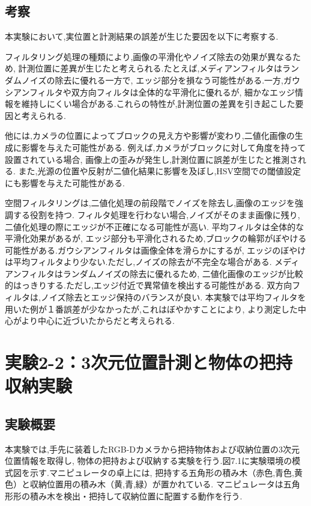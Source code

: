\subsection{考察}
本実験において,実位置と計測結果の誤差が生じた要因を以下に考察する.

フィルタリング処理の種類により,画像の平滑化やノイズ除去の効果が異なるため,
計測位置に差異が生じたと考えられる.たとえば,メディアンフィルタはランダムノイズの除去に優れる一方で,
エッジ部分を損なう可能性がある.一方,ガウシアンフィルタや双方向フィルタは全体的な平滑化に優れるが,
細かなエッジ情報を維持しにくい場合がある.これらの特性が,計測位置の差異を引き起こした要因と考えられる.

他には,カメラの位置によってブロックの見え方や影響が変わり,二値化画像の生成に影響を与えた可能性がある.
例えば,カメラがブロックに対して角度を持って設置されている場合,
画像上の歪みが発生し,計測位置に誤差が生じたと推測される.
また,光源の位置や反射が二値化結果に影響を及ぼし,HSV空間での閾値設定にも影響を与えた可能性がある.

空間フィルタリングは,二値化処理の前段階でノイズを除去し,画像のエッジを強調する役割を持つ.
フィルタ処理を行わない場合,ノイズがそのまま画像に残り,
二値化処理の際にエッジが不正確になる可能性が高い. 平均フィルタは全体的な平滑化効果があるが,
エッジ部分も平滑化されるため,ブロックの輪郭がぼやける可能性がある.ガウシアンフィルタは画像全体を滑らかにするが,
エッジのぼやけは平均フィルタより少ない.ただし,ノイズの除去が不完全な場合がある.
メディアンフィルタはランダムノイズの除去に優れるため,
二値化画像のエッジが比較的はっきりする.ただし,エッジ付近で異常値を検出する可能性がある.
双方向フィルタは,ノイズ除去とエッジ保持のバランスが良い.
本実験では平均フィルタを用いた例が１番誤差が少なかったが,これはぼやかすことにより,
より測定した中心がより中心に近づいたからだと考えられる.


\section{実験2-2：3次元位置計測と物体の把持収納実験}

\subsection{実験概要}
本実験では,手先に装着したRGB-Dカメラから把持物体および収納位置の3次元位置情報を取得し,
物体の把持および収納する実験を行う.図7.1に実験環境の模式図を示す.マニピュレータの卓上には,
把持する五角形の積み木（赤色,青色,黄色）と収納位置用の積み木（黄,青,緑）が置かれている.
マニピュレータは五角形形の積み木を検出・把持して収納位置に配置する動作を行う.

